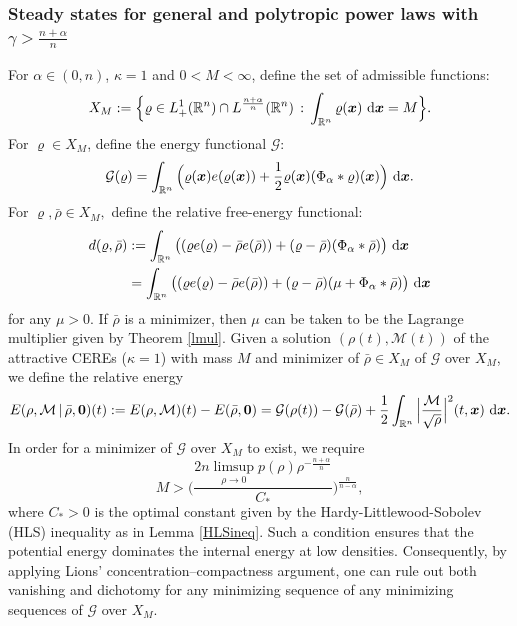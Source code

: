 \documentclass[reqno,11pt]{amsart}
\numberwithin{equation}{section}
\theoremstyle{definition}
\def\dd{{\, \rm d}}
\begin{document}
\subsubsection{Steady states for general and polytropic power laws with $\gamma > \frac{n + \alpha}{n}$}
For $\alpha \in (0,n)$, $\kappa =1$ and $0<M<\infty$, define the set of admissible
functions{\rm:}
\begin{equation*}
X_M := \Big\{ \varrho \in L^1_+(\mathbb{R}^n) \cap L^\frac{n + \alpha}{n}(\mathbb{R}^n)
\, : \, \int_{\mathbb{R}^n} \varrho(\boldsymbol{x}) \, \dd \boldsymbol{x} = M \Big\}.
\end{equation*}
For $\varrho\in X_M$, define the energy functional $\mathcal{G}$:
\begin{equation*}
\mathcal{G}(\varrho)=\int_{\mathbb{R}^n} \Big(\varrho(\boldsymbol{x}) e(\varrho(\boldsymbol{x}))+\frac{1}{2}\varrho(\boldsymbol{x})(\Phi_\alpha\ast \varrho)(\boldsymbol{x})\Big)\,\dd\boldsymbol{x}.
\end{equation*}
For $\varrho, \bar{\rho} \in X_M,$  define the  relative free-energy functional:
\begin{equation*}
\begin{split}
    d(\varrho,\bar{\rho}) & := \int_{\mathbb{R}^n}\big((\varrho e(\varrho)-\bar{\rho}e(\bar{\rho}))+(\varrho-\bar{\rho})(\Phi_\alpha\ast\bar{\rho})\big)\,\dd \boldsymbol{x}\\
    & = \int_{\mathbb{R}^n}\big((\varrho e(\varrho)-\bar{\rho}e(\bar{\rho}))+(\varrho-\bar{\rho})(\mu + \Phi_\alpha\ast\bar{\rho})\big)\,\dd \boldsymbol{x}
\end{split}
\end{equation*}
for any $\mu > 0$. If $\bar{\rho}$ is a minimizer, then $\mu$ can be taken to be the Lagrange multiplier given by Theorem \ref{lmul}. Given a solution $(\rho(t),\mathcal{M}(t))$ of the attractive CEREs {\rm (}$\kappa = 1${\rm )} with mass $M$ and minimizer of $\bar{\rho} \in X_M$ of $\mathcal{G}$ over $X_M$, we define the relative energy
\begin{equation}\label{Energydiff}
     E(\rho,\mathcal{M}\, | \, \bar{\rho}, \boldsymbol{0})(t):= E(\rho,\mathcal{M})(t) - E(\bar{\rho},\boldsymbol{0}) = \mathcal{G}(\rho(t)) - \mathcal{G}(\bar{\rho})
    + \frac{1}{2}\int_{\mathbb{R}^n} \Big|\frac{\mathcal{M}}{\sqrt{\rho}}\Big|^2(t,\boldsymbol{x})\,\dd\boldsymbol{x}.
\end{equation}
In order for a minimizer of $\mathcal{G}$ over $X_M$ to exist, we require
\begin{equation}\label{lower}
    M > \bigg ( \frac{2n \limsup_{\rho \to 0} p(\rho) \rho^{-\frac{n +\alpha}{n}}}{ C_*} \bigg )^\frac{n}{n-\alpha},
\end{equation} 
where $C_* > 0$ is the optimal constant given by the Hardy-Littlewood-Sobolev (HLS) inequality as in Lemma \ref{HLSineq}.
Such a condition ensures that the potential energy dominates the internal energy at low densities. Consequently, by applying Lions' concentration–compactness argument, one can rule out both vanishing and dichotomy for any minimizing sequence
of any minimizing sequences of $\mathcal{G}$ over $X_M$. 
\end{document}
